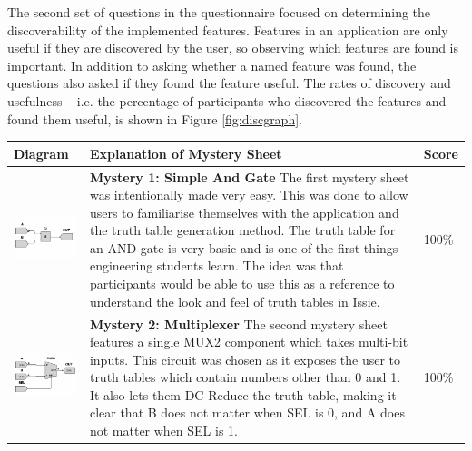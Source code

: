 The second set of questions in the questionnaire focused on determining the discoverability of the implemented features. Features in an application are only useful if they are discovered by the user, so observing which features are found is important. In addition to asking whether a named feature was found, the questions also asked if they found the feature useful. The rates of discovery and usefulness -- i.e. the percentage of participants who discovered the features and found them useful, is shown in Figure \ref{fig:discgraph}.

\begin{table}[h]
    \centering
    \begin{tabular}{|m{4.2cm}|m{7cm}|m{2cm}|}
    \hline
        \textbf{Diagram} & \textbf{Explanation of Mystery Sheet} & \textbf{Score} \\
        \hline
        \includegraphics[width=4cm]{06.TestRes/m1.png} & \textbf{Mystery 1: Simple And Gate} The first mystery sheet was intentionally made very easy. This was done to allow users to familiarise themselves with the application and the truth table generation method. The truth table for an AND gate is very basic and is one of the first things engineering students learn. The idea was that participants would be able to use this as a reference to understand the look and feel of truth tables in Issie. & 100\% \\ \hline
        
        \includegraphics[width=4cm]{06.TestRes/m2.png}& \textbf{Mystery 2: Multiplexer} The second mystery sheet features a single MUX2 component which takes multi-bit inputs. This circuit was chosen as it exposes the user to truth tables which contain numbers other than 0 and 1. It also lets them DC Reduce the truth table, making it clear that B does not matter when SEL is 0, and A does not matter when SEL is 1. & 100\% \\
         \hline
         

\end{tabular}
\end{table}
